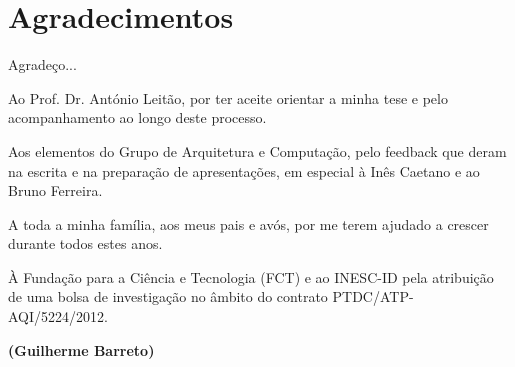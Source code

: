 
\chapter*{Agradecimentos}

Agradeço...

Ao Prof. Dr. António Leitão, por ter aceite orientar a minha tese e pelo acompanhamento ao longo deste processo.

Aos elementos do Grupo de Arquitetura e Computação, pelo feedback que deram na escrita e na preparação de apresentações, em especial à Inês Caetano e ao Bruno Ferreira.

A toda a minha família, aos meus pais e avós, por me terem ajudado a crescer durante todos estes anos.

À Fundação para a Ciência e Tecnologia (FCT) e ao INESC-ID pela atribuição de uma bolsa de investigação no âmbito do contrato PTDC/ATP-AQI/5224/2012.

{\bf(Guilherme Barreto)}





